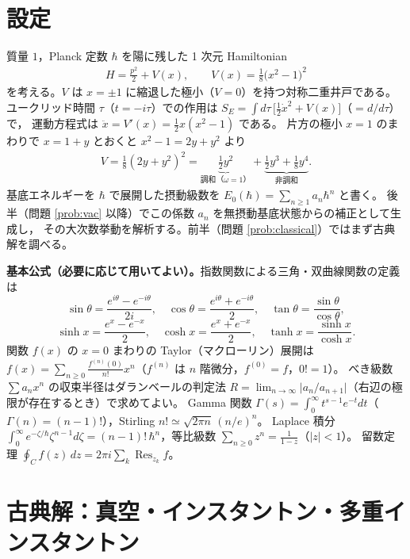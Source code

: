 \documentclass[dvipdfmx, uplatex]{jsarticle}
\newcommand{\hb}{\hbar}
\theoremstyle{definition}
\begin{document}
\section{設定}
質量 $1$，Planck 定数 $\hb$ を陽に残した 1 次元 Hamiltonian
\begin{align}
    H=\frac{p^2}{2}+V(x),\qquad V(x)=\frac18\bigl(x^2-1\bigr)^2
\label{eq:H}
\end{align}
を考える。$V$ は $x=\pm1$ に縮退した極小（$V=0$）を持つ対称二重井戸である。
ユークリッド時間 $\tau$（$t=-i\tau$）での作用は
$S_E=\int d\tau\,\bigl[\tfrac12\dot x^2+V(x)\bigr]$（$\dot{}=d/d\tau$）で，
運動方程式は $\ddot x=V'(x)=\tfrac12 x(x^2-1)$ である。
片方の極小 $x=1$ のまわりで $x=1+y$ とおくと $x^2-1=2y+y^2$ より
\begin{align}
    V=\frac18(2y+y^2)^2=\underbrace{\tfrac12 y^2}_{\text{調和}（\omega=1）}
    +\underbrace{\tfrac12 y^3+\tfrac18 y^4}_{\text{非調和}}.
\label{eq:Vexp}
\end{align}
基底エネルギーを $\hb$ で展開した摂動級数を $E_0(\hb)=\sum_{n\ge1}a_n\hb^n$ と書く。
後半（問題 \ref{prob:vac} 以降）でこの係数 $a_n$ を無摂動基底状態からの補正として生成し，
その大次数挙動を解析する。前半（問題 \ref{prob:classical}）ではまず古典解を調べる。

\medskip
\noindent\textbf{基本公式（必要に応じて用いてよい）。}指数関数による三角・双曲線関数の定義は
\[
    \sin\theta=\frac{e^{i\theta}-e^{-i\theta}}{2i},\quad
    \cos\theta=\frac{e^{i\theta}+e^{-i\theta}}{2},\quad
    \tan\theta=\frac{\sin\theta}{\cos\theta},
\]
\[
    \sinh x=\frac{e^{x}-e^{-x}}{2},\quad
    \cosh x=\frac{e^{x}+e^{-x}}{2},\quad
    \tanh x=\frac{\sinh x}{\cosh x}.
\]
関数 $f(x)$ の $x=0$ まわりの Taylor（マクローリン）展開は
$f(x)=\sum_{n\ge0}\frac{f^{(n)}(0)}{n!}x^n$（$f^{(n)}$ は $n$ 階微分，$f^{(0)}=f$，$0!=1$）。
べき級数 $\sum a_n x^n$ の収束半径はダランベールの判定法
$R=\lim_{n\to\infty}\bigl|a_n/a_{n+1}\bigr|$（右辺の極限が存在するとき）で求めてよい。
Gamma 関数 $\Gamma(s)=\int_0^\infty t^{s-1}e^{-t}dt$（$\Gamma(n)=(n-1)!$），Stirling $n!\simeq\sqrt{2\pi n}\,(n/e)^n$。
Laplace 積分 $\int_0^\infty e^{-\zeta/\hb}\zeta^{n-1}d\zeta=(n-1)!\,\hb^{n}$，等比級数 $\sum_{n\ge0}z^n=\tfrac{1}{1-z}$（$|z|<1$）。
留数定理 $\oint_C f(z)\,dz=2\pi i\sum_k\operatorname{Res}_{z_k}f$。

\section{古典解：真空・インスタントン・多重インスタントン}
\end{document}
